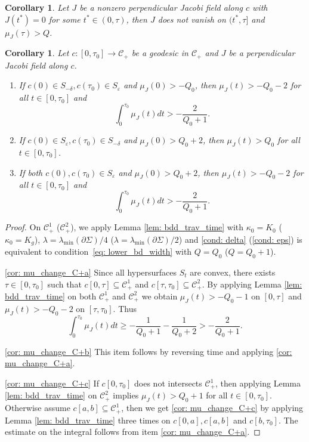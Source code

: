 \documentclass[JEP,XML,SOM,Unicode,NoFloatCountersInSection]{cedram}
\newenvironment{enumeratea}
{\bgroup\def\theenumi{\alph{enumi}}\begin{enumerate}}
{\end{enumerate}\egroup}
\newtheorem{corollary}[theorem]{Corollary}
\theoremstyle{definition}
\let\eps\varepsilon
\renewcommand{\>}{{\rangle}}
\newcommand{\<}{{\langle}}
\begin{document}
\begin{corollary}\label{cor: inf_at_C1}
Let $J$ be a nonzero perpendicular Jacobi field along $c$ with $J(t^*)=0$ for some $t^*\in(0,\tau)$, then $J$ does not vanish on $(t^*,\tau]$ and $\mu_J(\tau)>Q$.
\end{corollary}

\begin{corollary}\label{cor: mu_change_C+}
Let $c:[0,\tau_0]\to \mathcal{C}_+$ be a geodesic in $\mathcal{C}_+$ and $J$ be a perpendicular Jacobi field along $c$.

\begin{enumeratea}
\item\label{cor: mu_change_C+a}
If $c(0)\in S_{-\delta}, c(\tau_0)\in S_{\eps}$ and $\mu_J(0)>-Q_0$, then $\mu_J(t)>-Q_0-2$ for all $t\in [0,\tau_0]$ and
\[
\int_0^{\tau_0} \mu_J(t)dt> -\frac{2}{Q_0+1}.
\]

\item\label{cor: mu_change_C+b}
If $c(0)\in S_{\eps}, c(\tau_0)\in S_{-\delta}$ and $\mu_J(0)>Q_0+2$, then $\mu_J(t)>Q_0$ for all $t\in [0,\tau_0]$.

\item\label{cor: mu_change_C+c}
If both $c(0), c(\tau_0)\in S_{\eps}$ and $\mu_J(0)>Q_0+2$, then $\mu_J(t)>-Q_0-2$ for all $t\in [0,\tau_0]$ and
\[
\int_0^{\tau_0} \mu_J(t)dt> -\frac{2}{Q_0+1}.
\]
\end{enumeratea}
\end{corollary}

\begin{proof}
On $\mathcal{C}_+^1$ (\resp $\mathcal{C}_+^2$), we apply Lemma \ref{lem: bdd_trav_time} with $\kappa_0=K_0$ (\resp $\kappa_0=K_g$), $\lambda=\lambda_{\min}(\partial\Sigma)/4$ (\resp $\lambda=\lambda_{\min}(\partial\Sigma)/2$) and \eqref{cond: delta} (\resp \eqref{cond: eps}) is equivalent to condition~\eqref{eq: lower_bd_width} with $Q=Q_0$ (\resp $Q=Q_0+1$).

\eqref{cor: mu_change_C+a} Since all hypersurfaces $S_t$ are convex, there exists $\tau\!\in\! [0,\tau_0]$ such that $c[0,\tau]\!\subseteq\! \mathcal{C}_+^1$ and $c[\tau, \tau_0]\subseteq \mathcal{C}_+^2$. By applying Lemma \ref{lem: bdd_trav_time} on both $\mathcal{C}_+^1$ and $\mathcal{C}_+^2$ we obtain $\mu_J(t)>-Q_0-1$ on $[0,\tau]$ and $\mu_J(t)>-Q_0-2$ on $[\tau, \tau_0]$. Thus
\[
\int_0^{\tau_0} \mu_J(t)dt\geq -\frac{1}{Q_0+1}-\frac{1}{Q_0+2}> -\frac{2}{Q_0+1}.
\]

\eqref{cor: mu_change_C+b} This item follows by reversing time and applying \eqref{cor: mu_change_C+a}.

\eqref{cor: mu_change_C+c} If $c[0,\tau_0]$ does not intersects $\mathcal{C}_+^1$, then applying Lemma \ref{lem: bdd_trav_time} on $\mathcal{C}_+^2$ implies $\mu_J(t)>Q_0+1$ for all $t\in [0,\tau_0]$. Otherwise assume $c[a, b]\subseteq \mathcal{C}_+^1$, then we get \eqref{cor: mu_change_C+c} by applying Lemma \ref{lem: bdd_trav_time} three times on $c[0,a], c[a,b]$ and $c[b,\tau_0]$. The estimate on the integral follows from item \eqref{cor: mu_change_C+a}.
\end{proof}
\end{document}
